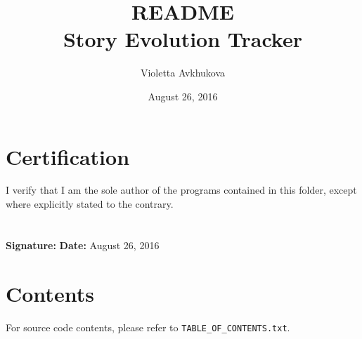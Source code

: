 \documentclass[11pt]{article}
\title{README \\ Story Evolution Tracker}
\author{Violetta Avkhukova}
\date{August 26, 2016}
\begin{document}
\maketitle

\section{Certification}
I verify that I am the sole author of the programs contained in this folder, except where explicitly stated to the contrary. \\ \\ \\
\textbf{Signature:} \hspace*{6cm} \textbf{Date:} August 26, 2016

\section{Contents}
For source code contents, please refer to \lstinline|TABLE_OF_CONTENTS.txt|.
\end{document}
